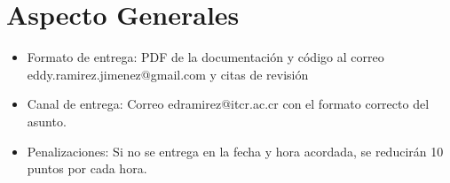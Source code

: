 \documentclass[11pt]{article}
\begin{document}
\section{Aspecto Generales}
\begin{itemize}
\item Formato de entrega: PDF de la documentación y código al correo eddy.ramirez.jimenez@gmail.com y citas de revisión
\item Canal de entrega: Correo edramirez@itcr.ac.cr con el formato correcto del asunto.
\item Penalizaciones: Si no se entrega en la fecha y hora acordada, se reducirán 10 puntos por cada hora.
\end{itemize}
\end{document}
